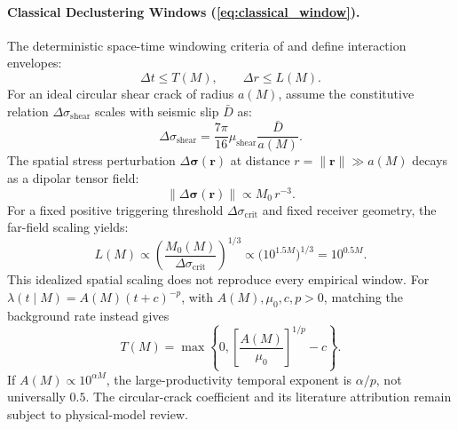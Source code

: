 \paragraph{Classical Declustering Windows (\cref{eq:classical_window}).}
The deterministic space-time windowing criteria of \citet{gardner1974} and
\citet{reasenberg1985} define interaction envelopes:
\begin{equation}
  \Delta t \le T(M), \qquad \Delta r \le L(M).
\end{equation}
For an ideal circular shear crack of radius $a(M)$, assume the
constitutive relation
$\Delta\sigma_{\mathrm{shear}}$ scales with seismic slip $\bar{D}$ as:
\begin{equation}
  \Delta\sigma_{\mathrm{shear}} = \frac{7\pi}{16}
  \mu_{\mathrm{shear}} \frac{\bar{D}}{a(M)}.
  \label{eq:supp_eshelby_stress}
\end{equation}
The spatial stress perturbation $\Delta\bm{\sigma}(\mathbf{r})$ at
distance $r = \|\mathbf{r}\| \gg a(M)$ decays as a dipolar tensor field:
\begin{equation}
  \|\Delta\bm{\sigma}(\mathbf{r})\| \propto M_0 \, r^{-3}.
  \label{eq:supp_stress_decay}
\end{equation}
For a fixed positive triggering threshold $\Delta\sigma_{\mathrm{crit}}$
and fixed receiver geometry, the far-field scaling yields:
\begin{equation}
  L(M) \propto \left( \frac{M_0(M)}{\Delta\sigma_{\mathrm{crit}}}
  \right)^{\!1/3}
  \propto \bigl( 10^{1.5 M} \bigr)^{1/3} = 10^{0.5 M}.
  \label{eq:supp_spatial_window_scaling}
\end{equation}
This idealized spatial scaling does not reproduce every empirical window.
For $\lambda(t\mid M)=A(M)(t+c)^{-p}$, with $A(M),\mu_0,c,p>0$,
matching the background rate instead gives
\begin{equation}
  T(M)=\max\left\{0,\left[\frac{A(M)}{\mu_0}\right]^{1/p}-c\right\}.
\end{equation}
If $A(M)\propto10^{\alpha M}$, the large-productivity temporal exponent
is $\alpha/p$, not universally $0.5$. The circular-crack coefficient and
its literature attribution remain subject to physical-model review.

